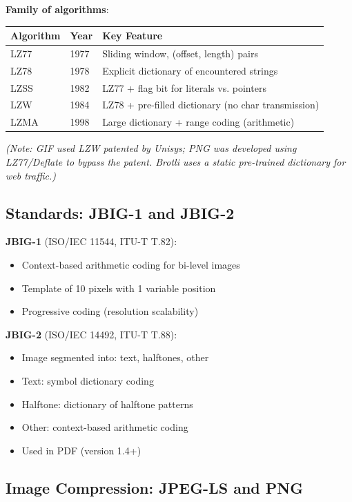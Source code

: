 \textbf{Family of algorithms}:

\begin{center}
\begin{tabular}{|l|l|l|}
\hline
\textbf{Algorithm} & \textbf{Year} & \textbf{Key Feature} \\ \hline
LZ77 & 1977 & Sliding window, (offset, length) pairs \\ \hline
LZ78 & 1978 & Explicit dictionary of encountered strings \\ \hline
LZSS & 1982 & LZ77 + flag bit for literals vs. pointers \\ \hline
LZW & 1984 & LZ78 + pre-filled dictionary (no char transmission) \\ \hline
LZMA & 1998 & Large dictionary + range coding (arithmetic) \\ \hline
\end{tabular}
\end{center}

\textit{(Note: GIF used LZW patented by Unisys; PNG was developed using LZ77/Deflate to bypass the patent. Brotli uses a static pre-trained dictionary for web traffic.)}

\subsection{Standards: JBIG-1 and JBIG-2}

\textbf{JBIG-1} (ISO/IEC 11544, ITU-T T.82):
\begin{itemize}
\item Context-based arithmetic coding for bi-level images
\item Template of 10 pixels with 1 variable position
\item Progressive coding (resolution scalability)
\end{itemize}

\textbf{JBIG-2} (ISO/IEC 14492, ITU-T T.88):
\begin{itemize}
\item Image segmented into: text, halftones, other
\item Text: symbol dictionary coding
\item Halftone: dictionary of halftone patterns
\item Other: context-based arithmetic coding
\item Used in PDF (version 1.4+)
\end{itemize}

\subsection{Image Compression: JPEG-LS and PNG}

